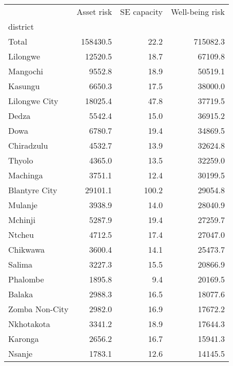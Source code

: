 \begin{tabular}{lrrr}
\toprule
{} &  Asset risk &  SE capacity &  Well-being risk \\
district       &             &              &                  \\
\midrule
Total          &    158430.5 &         22.2 &         715082.3 \\
Lilongwe       &     12520.5 &         18.7 &          67109.8 \\
Mangochi       &      9552.8 &         18.9 &          50519.1 \\
Kasungu        &      6650.3 &         17.5 &          38000.0 \\
Lilongwe City  &     18025.4 &         47.8 &          37719.5 \\
Dedza          &      5542.4 &         15.0 &          36915.2 \\
Dowa           &      6780.7 &         19.4 &          34869.5 \\
Chiradzulu     &      4532.7 &         13.9 &          32624.8 \\
Thyolo         &      4365.0 &         13.5 &          32259.0 \\
Machinga       &      3751.1 &         12.4 &          30199.5 \\
Blantyre City  &     29101.1 &        100.2 &          29054.8 \\
Mulanje        &      3938.9 &         14.0 &          28040.9 \\
Mchinji        &      5287.9 &         19.4 &          27259.7 \\
Ntcheu         &      4712.5 &         17.4 &          27047.0 \\
Chikwawa       &      3600.4 &         14.1 &          25473.7 \\
Salima         &      3227.3 &         15.5 &          20866.9 \\
Phalombe       &      1895.8 &          9.4 &          20169.5 \\
Balaka         &      2988.3 &         16.5 &          18077.6 \\
Zomba Non-City &      2982.0 &         16.9 &          17672.2 \\
Nkhotakota     &      3341.2 &         18.9 &          17644.3 \\
Karonga        &      2656.2 &         16.7 &          15941.3 \\
Nsanje         &      1783.1 &         12.6 &          14145.5 \\

\end{tabular}
